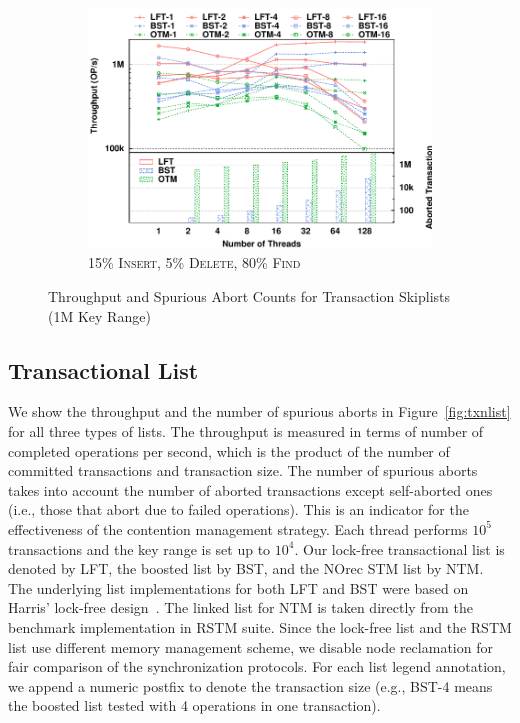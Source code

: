 \documentclass{sig-alternate-05-2015}
\begin{document}
\begin{figure}[t]
\begin{subfigure}{0.325\textwidth}
		\includegraphics[width=1\columnwidth]{./data/amdskip15ins10kfilled.pdf}
		\vspace{-0.17in}
		\caption{15\% \textsc{Insert}, 5\% \textsc{Delete}, 80\% \textsc{Find}}
		\label{fig:txnskip15}
	\end{subfigure}
	\caption{Throughput and Spurious Abort Counts for Transaction Skiplists (1M Key Range)}
	\label{fig:txnskip}
\end{figure}

\subsection{Transactional List}
\label{sec:txnlistexp}
We show the throughput and the number of spurious aborts in Figure~\ref{fig:txnlist} for all three types of lists.
The throughput is measured in terms of number of completed operations per second, which is the product of the number of committed transactions and transaction size.
The number of spurious aborts takes into account the number of aborted transactions except self-aborted ones (i.e., those that abort due to failed operations).
This is an indicator for the effectiveness of the contention management strategy.
Each thread performs $10^5$ transactions and the key range is set up to $10^4$.
Our lock-free transactional list is denoted by LFT, the boosted list by BST, and the NOrec STM list by NTM. 
The underlying list implementations for both LFT and BST were based on Harris' lock-free design~\cite{harris2001pragmatic}.
The linked list for NTM is taken directly from the benchmark implementation in RSTM suite.
Since the lock-free list and the RSTM list use different memory management scheme, we disable node reclamation for fair comparison of the synchronization protocols.
For each list legend annotation, we append a numeric postfix to denote the transaction size (e.g., BST-4 means the boosted list tested with 4 operations in one transaction). 
\end{document}
